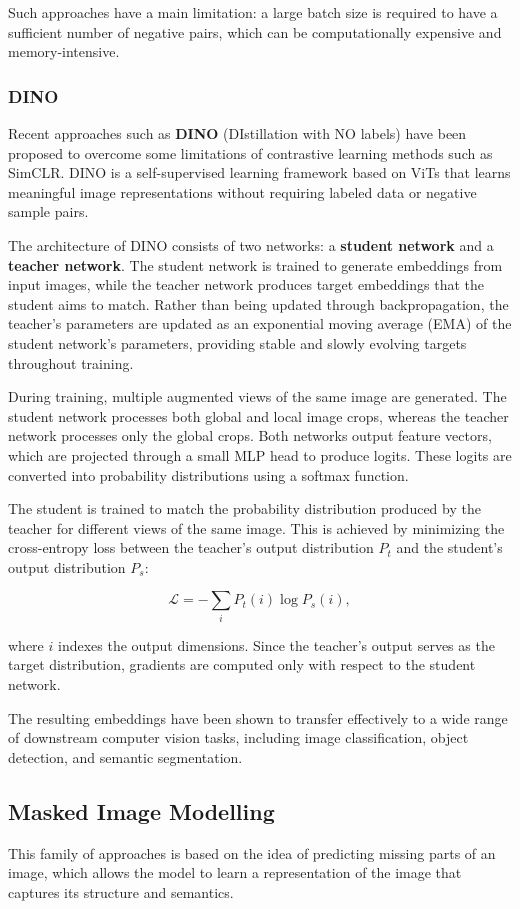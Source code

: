 Such approaches have a main limitation: a large batch size is required to have a sufficient number of negative pairs, which can be computationally expensive and memory-intensive.


\subsubsection{DINO}
Recent approaches such as \textbf{DINO} (DIstillation with NO labels) have been proposed to overcome some limitations of contrastive learning methods such as SimCLR. 
DINO is a self-supervised learning framework based on ViTs that learns meaningful image representations without requiring labeled data or negative sample pairs.

The architecture of DINO consists of two networks: a \textbf{student network} and a \textbf{teacher network}. 
The student network is trained to generate embeddings from input images, while the teacher network produces target embeddings that the student aims to match. 
Rather than being updated through backpropagation, the teacher's parameters are updated as an exponential moving average (EMA) of the student network's parameters, 
providing stable and slowly evolving targets throughout training.

During training, multiple augmented views of the same image are generated. 
The student network processes both global and local image crops, whereas the teacher network processes only the global crops. 
Both networks output feature vectors, which are projected through a small MLP head to produce logits.
These logits are converted into probability distributions using a softmax function.

The student is trained to match the probability distribution produced by the teacher for different views of the same image. 
This is achieved by minimizing the cross-entropy loss between the teacher's output distribution $P_t$ and the student's output distribution $P_s$:

\[
\mathcal{L} = - \sum_{i} P_t(i)\log P_s(i),
\]

where $i$ indexes the output dimensions. Since the teacher's output serves as the target distribution, gradients are computed only with respect to the student network.

The resulting embeddings have been shown to transfer effectively to a wide range of downstream computer vision tasks, 
including image classification, object detection, and semantic segmentation.


\subsection{Masked Image Modelling}
This family of approaches is based on the idea of predicting missing parts of an image, which allows the model to learn a representation of the image that captures its structure and semantics.

